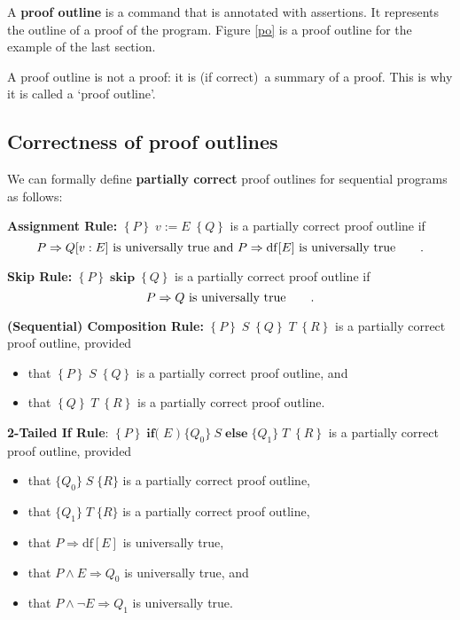 \documentclass[11pt]{article}%
\begin{document}
A \textbf{proof outline} is a command that is annotated with assertions. It
represents the outline of a proof of the program. Figure \ref{po} is a proof
outline for the example of the last section.

A proof outline is not a proof: it is (if correct)\ a summary of a proof. This
is why it is called a `proof outline'.

\subsection{Correctness of proof outlines}

We can formally define \textbf{partially correct} proof outlines for
sequential programs as follows:

\textbf{Assignment Rule:} $\left\{  P\right\}  \;v:=E\;\left\{  Q\right\}  $
is a partially correct proof outline if
\[
P\Rightarrow Q[v:E]\text{ is universally true and }P\Rightarrow\mathrm{df}%
[E]\text{ is universally true\qquad.}%
\]


\textbf{Skip Rule:} $\left\{  P\right\}  \;\mathbf{skip}\;\left\{  Q\right\}
$ is a partially correct proof outline if%
\[
P\Rightarrow Q\text{ is universally true\qquad.}%
\]


\textbf{(Sequential) Composition Rule:} $\left\{  P\right\}  \;S\;\left\{
Q\right\}  \;T\;\left\{  R\right\}  $ is a partially correct proof outline, provided

\begin{itemize}
\item that $\left\{  P\right\}  \;S\;\left\{  Q\right\}  $ is a partially
correct proof outline, and

\item that $\left\{  Q\right\}  \;T\;\left\{  R\right\}  $ is a partially
correct proof outline.
\end{itemize}

\textbf{2-Tailed If Rule}: $\left\{  P\right\}  \;\mathbf{if(}\;E\;)\;\{Q_{0}%
\}\ S\;\mathbf{else}\;\{Q_{1}\}\;T\;\left\{  R\right\}  $ is a partially
correct proof outline, provided

\begin{itemize}
\item that $\{Q_{0}\}\;S\;\{R\}$ is a partially correct proof outline,

\item that $\{Q_{1}\}\;T\;\{R\}$ is a partially correct proof outline,

\item that $P\Rightarrow\mathrm{df}[E]$ is universally true,

\item that $P\wedge E\Rightarrow Q_{0}$ is universally true, and

\item that $P\wedge\lnot E\Rightarrow Q_{1}$ is universally true.
\end{itemize}
\end{document}
